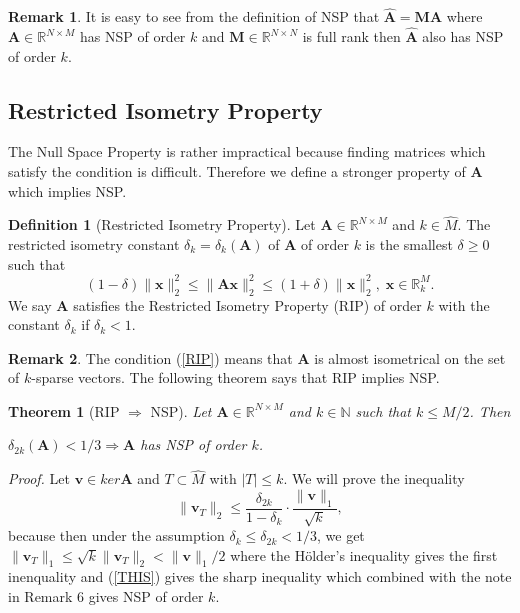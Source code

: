 \documentclass[11pt,oneside,czech,american]{book} %
\theoremstyle{plain}
\newtheorem{thm}{Theorem}
\theoremstyle{definition}
\newtheorem{defn}{Definition}
\newtheorem{rmrk}{Remark}
\begin{document}
\begin{rmrk}
	It is easy to see from the definition of NSP that $\hat{\bm{A}} = \bm{M} \bm{A}$ where $\bm{A} \in \mathbb{R}^{N \times M}$ has NSP of order $k$ and $\bm{M} \in \mathbb{R}^{N \times N}$ is full rank then $\hat{\bm{A}}$ also has NSP of order $k$.
\end{rmrk}

\subsection*{Restricted Isometry Property}
The Null Space Property is rather impractical because finding matrices which satisfy the condition is difficult. Therefore we define a stronger property of $\bm{A}$ which implies NSP.

\begin{defn}[Restricted Isometry Property]
	Let $\bm{A} \in \mathbb{R}^{N \times M}$ and $k \in \hat{M}$. The restricted isometry constant $\delta_k = \delta_k (\bm{A})$ of $\bm{A}$ of order $k$ is the smallest $\delta \geq 0$ such that
	\begin{equation}
		(1-\delta)\lVert \bm{x} \rVert_{2}^{2} \leq \lVert \bm{A} \bm{x} \rVert_{2}^{2} \leq (1+\delta)\lVert \bm{x} \rVert_{2}^{2}, \;  \bm{x} \in \mathbb{R}^{M}_{k}. \label{RIP}
	\end{equation}
	We say $\bm{A}$ satisfies the Restricted Isometry Property (RIP) of order $k$ with the constant $\delta_k$ if $\delta_k < 1$.
\end{defn}
\pagestyle{headings}

\begin{rmrk}
	The condition (\ref{RIP}) means that $\bm{A}$ is almost isometrical on the set of $k$-sparse vectors. The following theorem says that RIP implies NSP.
\end{rmrk}

\begin{thm}[RIP $\Rightarrow$ NSP]
	Let $\bm{A} \in \mathbb{R}^{N \times M}$ and $k \in \mathbb{N}$ such that $k \leq M/2$. Then
	\begin{center}
		$\delta_{2k}(\bm{A}) < 1/3 \Rightarrow \bm{A}$ has NSP of order $k$.
	\end{center}
	
\end{thm}
\emph{Proof.} Let $\bm{v} \in ker \bm{A}$ and $T \subset \hat{M}$ with $|T| \leq k$. We will prove the inequality
\begin{equation}
	\lVert \bm{v}_T\rVert_{2} \leq \frac{\delta_{2k}}{1-\delta_{k}} \cdot \frac{\lVert \bm{v} \rVert_{1}}{\sqrt{k}}, \label{THIS}
\end{equation}
because then under the assumption $\delta_{k} \leq \delta_{2k} < 1/3$, we get $\lVert \bm{v}_T \rVert_1 \leq \sqrt k\lVert \bm{v}_T \rVert_2 < \lVert \bm{v} \rVert_1 /2$ where the Hölder's inequality gives the first inenquality and (\ref{THIS}) gives the sharp inequality which combined with the note in Remark 6 gives NSP of order $k$.
\end{document}
